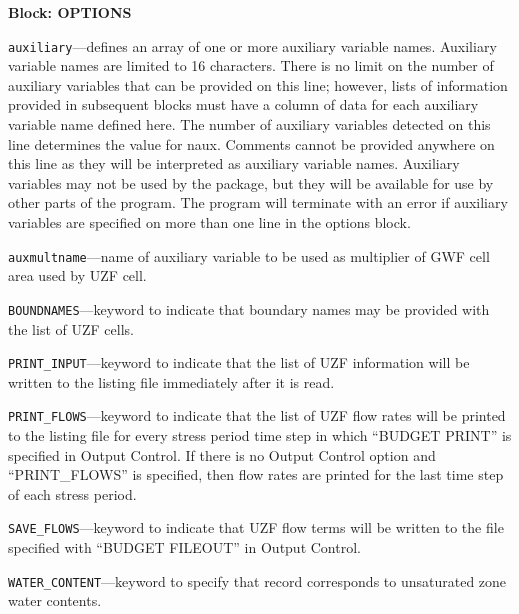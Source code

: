 
\item \textbf{Block: OPTIONS}

\begin{description}
\item \texttt{auxiliary}---defines an array of one or more auxiliary variable names.  Auxiliary variable names are limited to 16 characters.  There is no limit on the number of auxiliary variables that can be provided on this line; however, lists of information provided in subsequent blocks must have a column of data for each auxiliary variable name defined here.  The number of auxiliary variables detected on this line determines the value for naux.  Comments cannot be provided anywhere on this line as they will be interpreted as auxiliary variable names.  Auxiliary variables may not be used by the package, but they will be available for use by other parts of the program.  The program will terminate with an error if auxiliary variables are specified on more than one line in the options block.

\item \texttt{auxmultname}---name of auxiliary variable to be used as multiplier of GWF cell area used by UZF cell.

\item \texttt{BOUNDNAMES}---keyword to indicate that boundary names may be provided with the list of UZF cells.

\item \texttt{PRINT\_INPUT}---keyword to indicate that the list of UZF information will be written to the listing file immediately after it is read.

\item \texttt{PRINT\_FLOWS}---keyword to indicate that the list of UZF flow rates will be printed to the listing file for every stress period time step in which ``BUDGET PRINT'' is specified in Output Control.  If there is no Output Control option and ``PRINT\_FLOWS'' is specified, then flow rates are printed for the last time step of each stress period.

\item \texttt{SAVE\_FLOWS}---keyword to indicate that UZF flow terms will be written to the file specified with ``BUDGET FILEOUT'' in Output Control.

\item \texttt{WATER\_CONTENT}---keyword to specify that record corresponds to unsaturated zone water contents.


\end{description}
